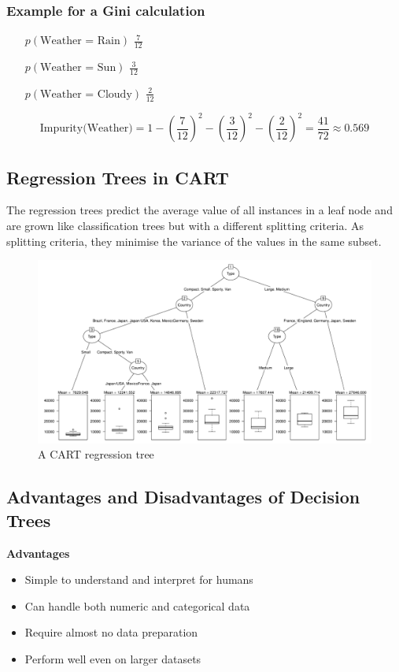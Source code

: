 \documentclass[11pt]{article}
\begin{document}
\subsubsection{Example for a Gini calculation}
\begin{itemize}[leftmargin=*, labelindent=4cm, labelsep=1cm]
    \item[$p(\text{Weather = Rain})$] $\frac{7}{12}$
    \item[$p(\text{Weather = Sun})$] $\frac{3}{12}$
    \item[$p(\text{Weather = Cloudy})$] $\frac{2}{12}$
\end{itemize}

\begin{equation*}
    \text{Impurity(Weather)} = 1 - (\frac{7}{12})^2 - (\frac{3}{12})^2 - (\frac{2}{12})^2 = \frac{41}{72} \approx 0.569
\end{equation*}

\subsection{Regression Trees in CART}

The regression trees predict the average value of all instances in a leaf node and are grown like classification trees but with a different splitting criteria. As splitting criteria, they minimise the variance of the values in the same subset.

\begin{figure}[tbh!]
    \centering
    \includegraphics[width=0.7\linewidth, keepaspectratio]{Pictures/regression_tree_CART}
    \caption{A CART regression tree}
    \label{fig:regressiontreecart}
\end{figure}

\subsection{Advantages and Disadvantages of Decision Trees}

\textbf{Advantages}
\begin{itemize}
    \item Simple to understand and interpret for humans
    \item Can handle both numeric and categorical data
    \item Require almost no data preparation
    \item Perform well even on larger datasets
\end{itemize}
\end{document}
